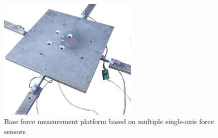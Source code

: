 \begin{figure}
    \centering
    \includegraphics[width=0.6\textwidth]{slike/Fig03_28.png}
    \caption{Base force measurement platform based on multiple single-axis force sensors}
    \label{fig:Platform}
\end{figure}

\newpage